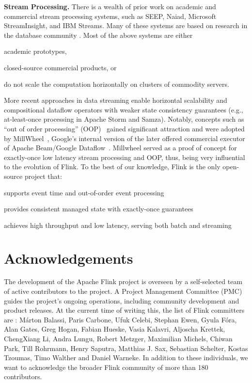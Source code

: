 \documentclass[11pt]{article}
\newcommand{\para}[1]{\vspace{2mm}\noindent\textbf{#1}}
\begin{document}
\para{Stream Processing.} There is a wealth of prior work on academic and commercial stream processing systems, such as SEEP, Naiad, Microsoft StreamInsight, and IBM Streams. Many of these systems are based on research in the database community \cite{chandrasekaran2003psoup,abadi2005design,arasu2004stream,chandramouli2014trill,gedik2008spade,migliavacca2010seep,murray2013naiad}. Most of the above systems are either
\begin{inparaenum}[i)]
  \item academic prototypes,
  \item closed-source commercial products, or 
  \item do not scale the computation horizontally on clusters of commodity servers.
\end{inparaenum}
More recent approaches in data streaming enable horizontal scalability and compositional dataflow operators with weaker state consistency guarantees (e.g., at-least-once processing in Apache Storm and Samza). Notably, concepts such as ``out of order processing'' (OOP)~\cite{li2008out} gained significant attraction and were adopted by  MillWheel~\cite{akidau2013millwheel}, Google's internal version of the later offered commercial executor of Apache Beam/Google Dataflow~\cite{akidau2015dataflow}. Millwheel served as a proof of concept for exactly-once low latency stream processing and OOP, thus, being very influential to the evolution of Flink. To the best of our knowledge, Flink is the only open-source project that:
\begin{inparaenum}[i)]
  \item supports event time and out-of-order event processing
  \item provides consistent managed state with exactly-once guarantees
  \item achieves high throughput and low latency, serving both batch and streaming
\end{inparaenum}

\vspace{-4mm}
\section{Acknowledgements}
\vspace{-2mm}
\label{sec:acknowledgements}
The development of the Apache Flink project is overseen by a self-selected team of active contributors to the project. A Project Management Committee (PMC) guides the project's ongoing operations, including community development and product releases. At the current time of writing this, the list of Flink committers are : M\'arton Balassi, Paris Carbone, Ufuk Celebi, Stephan Ewen, Gyula F\'ora, Alan Gates, Greg Hogan, Fabian Hueske, Vasia Kalavri, Aljoscha Krettek, ChengXiang Li, Andra Lungu, Robert Metzger, Maximilian Michels, Chiwan Park, Till Rohrmann, Henry Saputra, Matthias J. Sax, Sebastian Schelter, Kostas Tzoumas, Timo Walther and Daniel Warneke. In addition to these individuals, we want to acknowledge the broader Flink community of more than 180 contributors.
\end{document}
